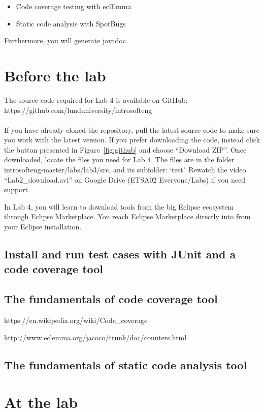 \documentclass{scrreprt}
\begin{document}
\begin{itemize}
\item Code coverage testing with eclEmma
\item Static code analysis with SpotBugs
\end{itemize}

Furthermore, you will generate javadoc.

\chapter{Before the lab}
The source code required for Lab 4 is available on GitHub:\\https://github.com/lunduniversity/introsofteng\\\\
If you have already cloned the repository, pull the latest source code to make sure you work with the latest version. If you prefer downloading the code, instead click the button presented in Figure~\ref{fig:github} and choose ``Download ZIP''. Once downloaded, locate the files you need for Lab 4. The files are in the folder introsofteng-master/labs/lab3/src, and its subfolder: `test'. Rewatch the video ``Lab2_download.avi'' on Google Drive (ETSA02 Everyone/Labs) if you need support.

In Lab 4, you will learn to download tools from the big Eclipse ecosystem through Eclipse Marketplace. You reach Eclipse Marketplace directly into from your Eclipse installation. 

\section{Install and run test cases with JUnit and a code coverage tool}

\section{The fundamentals of code coverage tool}

https://en.wikipedia.org/wiki/Code_coverage

http://www.eclemma.org/jacoco/trunk/doc/counters.html

\section{The fundamentals of static code analysis tool}

\chapter{At the lab} \label{sec:atlab}
\end{document}
